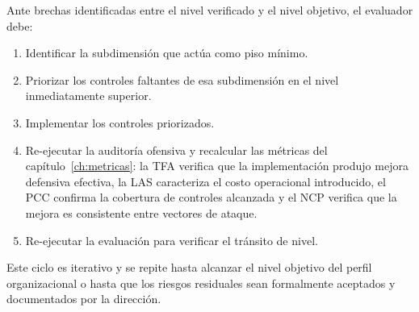 Ante brechas identificadas entre el nivel verificado y el nivel objetivo, el evaluador debe:

\begin{enumerate}[leftmargin=2em]
  \item Identificar la subdimensión que actúa como piso mínimo.
  \item Priorizar los controles faltantes de esa subdimensión en el nivel inmediatamente superior.
  \item Implementar los controles priorizados.
  \item Re-ejecutar la auditoría ofensiva y recalcular las métricas del capítulo~\ref{ch:metricas}: la TFA verifica que la implementación produjo mejora defensiva efectiva, la LAS caracteriza el costo operacional introducido, el PCC confirma la cobertura de controles alcanzada y el NCP verifica que la mejora es consistente entre vectores de ataque.
  \item Re-ejecutar la evaluación para verificar el tránsito de nivel.
\end{enumerate}

Este ciclo es iterativo y se repite hasta alcanzar el nivel objetivo del perfil organizacional o hasta que los riesgos residuales sean formalmente aceptados y documentados por la dirección.